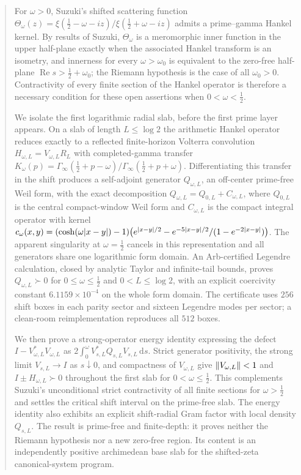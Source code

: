 \documentclass[11pt,a4paper]{article}
\newcommand{\Ginf}{\Gamma_{\!\infty}}
\renewcommand{\Re}{\operatorname{Re}}
\newcommand{\dd}{\,\mathrm d}
\DeclarePairedDelimiter{\abs}{\lvert}{\rvert}
\DeclarePairedDelimiter{\norm}{\lVert}{\rVert}
\theoremstyle{plain}
\theoremstyle{definition}
\numberwithin{equation}{section}
\begin{document}
\begin{abstract}
For $\omega>0$, Suzuki's shifted scattering function
$\Theta_\omega(z)=\xi(\tfrac12-\omega-iz)/\xi(\tfrac12+\omega-iz)$ admits a
prime--gamma Hankel kernel. By results of Suzuki, $\Theta_\omega$ is a
meromorphic inner function in the upper half-plane exactly when the associated
Hankel transform is an isometry, and innerness for every $\omega>\omega_0$ is
equivalent to the zero-free half-plane $\Re s>\tfrac12+\omega_0$; the Riemann
hypothesis is the case of all $\omega_0>0$. Contractivity of every finite
section of the Hankel operator is therefore a necessary condition for these
open assertions when $0<\omega<\tfrac12$.

We isolate the first logarithmic radial slab, before the first prime layer
appears. On a slab of length $L\le\log2$ the arithmetic Hankel operator reduces
exactly to a reflected finite-horizon Volterra convolution
$H_{\omega,L}=V_{\omega,L}R_L$ with completed-gamma transfer
$K_\omega(p)=\Ginf(\tfrac12+p-\omega)/\Ginf(\tfrac12+p+\omega)$.
Differentiating this transfer in the shift produces a self-adjoint generator
$Q_{\omega,L}$, an off-center prime-free Weil form, with the exact
decomposition $Q_{\omega,L}=Q_{0,L}+C_{\omega,L}$, where $Q_{0,L}$ is the
central compact-window Weil form and $C_{\omega,L}$ is the compact integral
operator with kernel
$c_\omega(x,y)=(\cosh(\omega\abs{x-y})-1)\bigl(e^{\abs{x-y}/2}-e^{-5\abs{x-y}/2}/(1-e^{-2\abs{x-y}})\bigr)$.
The apparent singularity at $\omega=\tfrac12$ cancels in this representation
and all generators share one logarithmic form domain. An Arb-certified
Legendre calculation, closed by analytic Taylor and infinite-tail bounds,
proves $Q_{\omega,L}\succ0$ for $0\le\omega\le\tfrac12$ and $0<L\le\log2$,
with an explicit coercivity constant $6.1159\times10^{-4}$ on the whole form
domain. The certificate uses $256$ shift boxes in each parity sector and
sixteen Legendre modes per sector; a clean-room reimplementation reproduces
all $512$ boxes.

We then prove a strong-operator energy identity expressing the defect
$I-V_{\omega,L}^{*}V_{\omega,L}$ as $2\int_0^\omega V_{s,L}^{*}Q_{s,L}V_{s,L}\dd s$.
Strict generator positivity, the strong limit $V_{s,L}\to I$ as $s\downarrow0$,
and compactness of $V_{\omega,L}$ give $\norm{V_{\omega,L}}<1$ and
$I\pm H_{\omega,L}\succ0$ throughout the first slab for $0<\omega\le\tfrac12$.
This complements Suzuki's unconditional strict contractivity of all finite
sections for $\omega>\tfrac12$ and settles the critical shift interval on the
prime-free slab. The energy identity also exhibits an explicit shift-radial
Gram factor with local density $Q_{s,L}$. The result is prime-free and
finite-depth: it proves neither the Riemann hypothesis nor a new zero-free
region. Its content is an independently positive archimedean base slab for the
shifted-zeta canonical-system program.
\end{abstract}
\end{document}
